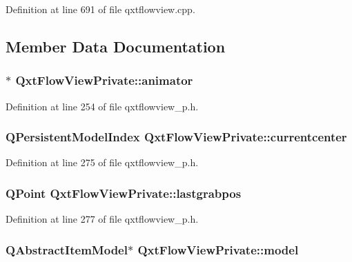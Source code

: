 Definition at line 691 of file qxtflowview.\-cpp.



\subsection{Member Data Documentation}
\hypertarget{class_qxt_flow_view_private_aadb557ae9a7eabda3d0e0c6181b5982b}{
\subsubsection[{animator}]{$\ast$ Qxt\-Flow\-View\-Private\-::animator}}\label{class_qxt_flow_view_private_aadb557ae9a7eabda3d0e0c6181b5982b}


Definition at line 254 of file qxtflowview\-\_\-p.\-h.

\hypertarget{class_qxt_flow_view_private_a51b8b502baa6b1fd0431f78a94ce17aa}{
\subsubsection[{currentcenter}]{\setlength{\rightskip}{0pt plus 5cm}Q\-Persistent\-Model\-Index Qxt\-Flow\-View\-Private\-::currentcenter}}\label{class_qxt_flow_view_private_a51b8b502baa6b1fd0431f78a94ce17aa}


Definition at line 275 of file qxtflowview\-\_\-p.\-h.

\hypertarget{class_qxt_flow_view_private_a7437764980c38acac02c612c1b0789c4}{
\subsubsection[{lastgrabpos}]{\setlength{\rightskip}{0pt plus 5cm}Q\-Point Qxt\-Flow\-View\-Private\-::lastgrabpos}}\label{class_qxt_flow_view_private_a7437764980c38acac02c612c1b0789c4}


Definition at line 277 of file qxtflowview\-\_\-p.\-h.

\hypertarget{class_qxt_flow_view_private_ab87088917a257e0d72f091cff5031b9c}{
\subsubsection[{model}]{\setlength{\rightskip}{0pt plus 5cm}Q\-Abstract\-Item\-Model$\ast$ Qxt\-Flow\-View\-Private\-::model}}\label{class_qxt_flow_view_private_ab87088917a257e0d72f091cff5031b9c}


